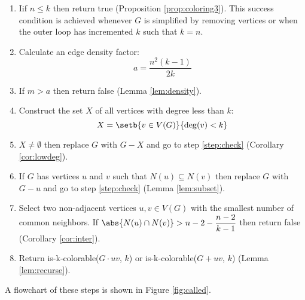 \begin{enumerate}
\item \label{step:check} Iif \(n\le k\) then return true (Proposition \ref{prop:coloring3}).  This success
  condition is achieved whenever \(G\) is simplified by removing vertices or when the outer loop has incremented
  \(k\) such that \(k=n\).

\item \label{step:dencalc} Calculate an edge density factor:
  \[a=\frac{n^2(k-1)}{2k}\]

\item \label{step:density} If \(m>a\) then return false (Lemma \ref{lem:density}).

\item \label{step:smallcalc} Construct the set \(X\) of all vertices with degree less than \(k\):
  \[X=\setb{v\in V(G)}{\deg(v)<k}\]

\item \label{step:small} \(X\ne\emptyset\) then replace \(G\) with \(G-X\) and go to step \ref{step:check} (Corollary
  \ref{cor:lowdeg}).

\item \label{step:neighbor} If \(G\) has vertices \(u\) and \(v\) such that \(N(u)\subseteq N(v)\) then replace
  \(G\) with \(G-u\) and go to step \ref{step:check} (Lemma \ref{lem:subset}).

\item \label{step:common} Select two non-adjacent vertices \(u,v\in V(G)\) with the smallest number of common
  neighbors.  If \(\displaystyle\abs{N(u)\cap N(v)}>n-2-\frac{n-2}{k-1}\) then return false (Corollary
  \ref{cor:inter}).

\item Return is-k-colorable(\(G\cdot uv\), \(k\)) or is-k-colorable(\(G+uv\), \(k\)) (Lemma \ref{lem:recurse}).
\end{enumerate}

A flowchart of these steps is shown in Figure \ref{fig:called}.

\afterpage{\clearpage}

